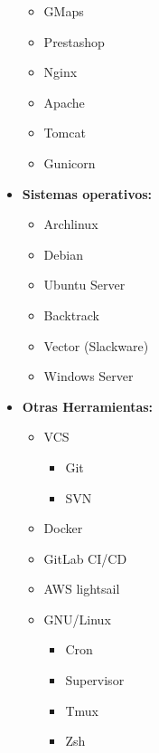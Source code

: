 \begin{multicols}{3}
\begin{itemize}
\begin{itemize}
        \item GMaps
        \item Prestashop
        \item Nginx
        \item Apache
        \item Tomcat
        \item Gunicorn
    \end{itemize}
\item
    \textbf{Sistemas operativos:}
    \begin{itemize}
        \item Archlinux
        \item Debian
        \item Ubuntu Server
        \item Backtrack
        \item Vector (Slackware)
        \item Windows Server
    \end{itemize}
\item
    \textbf{Otras Herramientas:}
    \begin{itemize}
        \item VCS
            \begin{itemize}
                \item Git
                \item SVN
            \end{itemize}
        \item Docker
        \item GitLab CI/CD
        \item AWS lightsail
        \item GNU/Linux
        \begin{itemize}
            \item Cron
            \item Supervisor
            \item Tmux
            \item Zsh
        \end{itemize}
    \end{itemize}
\end{itemize}
\end{multicols}
